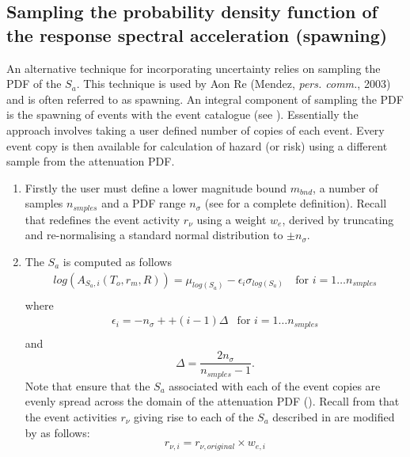 \subsection{Sampling the probability density function of
the response spectral acceleration (spawning)}
\label{attn:uncert-pdfchoice}


An alternative technique for incorporating uncertainty relies on
sampling the PDF of the $S_a$. This technique is used by Aon Re
(Mendez, \textit{pers. comm.}, 2003) and is often referred to as
spawning. An integral component of sampling the PDF is the
spawning of events with the event catalogue (see
). Essentially the approach involves taking
a user defined number of copies of each event. Every event copy is
then available for calculation of hazard (or risk) using a
different sample from the attenuation PDF.
\begin{enumerate}
\item Firstly the user must define a lower magnitude bound
$m_{bnd}$, a number of samples $n_{smples}$ and a PDF range
$n_\sigma$ (see  for a complete definition).
Recall that  redefines the event activity
$r_\nu$ using a weight $w_e$, derived by truncating and
re-normalising a standard normal distribution to $\pm n_\sigma$.
\item The $S_a$ is computed as follows
\begin{equation}
\label{attn:uncertainty-pdfsample}
\begin{array}{ll}
log(A_{S_a,i}(T_o,r_m,R)) = \mu_{log(S_a)} - \epsilon_i
\sigma_{log(S_a)}\ & \textrm{for $i=1 \ldots
n_{smples}$} \\
\end{array}
\end{equation}
where
\begin{equation}
\label{attn:uncertainty-def-epsilon}
\begin{array}{ll}
\epsilon_i = -n_\sigma + + (i-1)\Delta &
\textrm{for $i=1 \ldots n_{smples}$} \\
\end{array}
\end{equation}
and
\begin{equation}
\Delta = \frac{2n_\sigma}{n_{smples}-1}.
\end{equation}
Note that
ensure that the $S_a$ associated with each of the event copies are
evenly spread across the domain of the attenuation PDF
(). Recall from 
that the event activities $r_\nu$ giving rise to each of the $S_a$
described in  are modified by
 as follows:
\begin{equation}
r_{\nu,i} = r_{\nu,original} \times w_{e,i}
\end{equation}
\end{enumerate}

